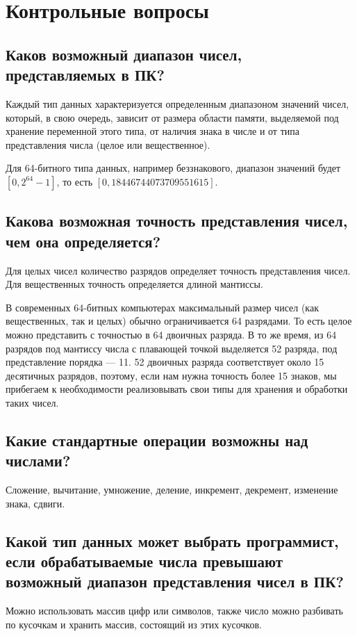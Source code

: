 \documentclass[a4paper,12pt]{extarticle}
\begin{document}
\section{Контрольные вопросы}
\subsection{Каков возможный диапазон чисел, представляемых в ПК?}
Каждый тип данных характеризуется определенным диапазоном  значений  чисел,  который,  в  свою  очередь,  зависит  от  размера области памяти, выделяемой под хранение переменной этого типа, от наличия знака в числе и от типа представления числа (целое или вещественное). 

Для 64-битного типа данных, например беззнакового, диапазон значений будет $[0, 2^{64}-1]$, то есть $[0, 18 446 744 073 709 551 615]$.

\subsection{Какова возможная точность представления чисел, чем она определяется?}
Для целых чисел количество разрядов определяет точность представления чисел. Для вещественных точность определяется длиной мантиссы.

В современных 64-битных компьютерах максимальный размер чисел (как вещественных, так и целых) обычно ограничивается 64 разрядами. То есть целое можно представить с точностью в 64 двоичных разряда. В то же время, из 64 разрядов под мантиссу числа с плавающей точкой выделяется 52 разряда, под представление порядка --- 11. 52 двоичных разряда соответствует около 15 десятичных разрядов, поэтому, если нам нужна точность более 15 знаков, мы прибегаем к необходимости реализовывать свои типы для хранения и обработки таких чисел.

\subsection{Какие стандартные операции возможны над числами?}
Сложение, вычитание, умножение, деление, инкремент, декремент, изменение знака, сдвиги.

\subsection{Какой тип данных может выбрать программист, если обрабатываемые числа превышают возможный диапазон представления чисел в ПК?}
Можно использовать массив цифр или символов, также число можно разбивать по кусочкам и хранить массив, состоящий из этих кусочков. 
\end{document}
